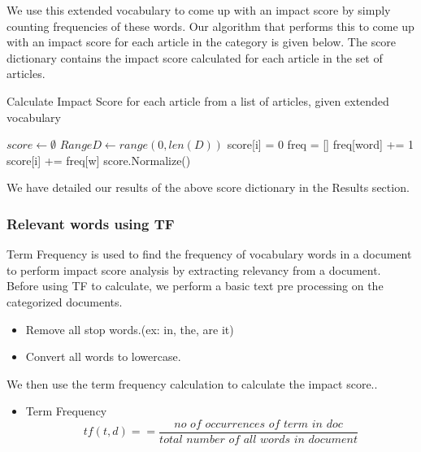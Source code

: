 \documentclass[paper=a4, fontsize=11pt]{scrartcl}
\numberwithin{equation}{section}		%
\numberwithin{figure}{section}			%
\numberwithin{table}{section}				%
\begin{document}
We use this extended vocabulary to come up with an impact score by simply counting frequencies of these words. Our algorithm that performs this to come up with an impact score for each article in the category is given below. The score dictionary contains the impact score calculated for each article in the set of articles.

\begin {center}
\begin {algorithm}[ht]
\SetNoFillComment
\caption{Calculate Impact Score for each article from a list of articles, given extended vocabulary}
 {
    $score \gets \emptyset $\;
    $RangeD \gets range(0, len(D)) $\;
     {
    	score[i] = 0 \;
	freq = [] \;
	 {
		freq[word] += 1 \;
	}
	 {
		score[i] += freq[w] \;
	}
    }
    score.Normalize() \;
    \;
}
\end {algorithm}
\end {center}

We have detailed our results of the above score dictionary in the Results section.

\subsubsection {Relevant words using TF}

Term Frequency is used to find the frequency of vocabulary words in a document to perform impact score analysis by extracting relevancy from a document.
Before using TF to calculate, we perform a basic text pre processing on the categorized documents.
\begin{itemize}
\item {Remove all stop words.(ex: in, the, are it)}
\item {Convert all words to lowercase.}
\end {itemize}
We then use the term frequency calculation to calculate the impact score..
\begin{itemize}
\item {Term Frequency}
\[tf(t,d) =  = \frac{\textit{no of occurrences of term in doc} }{\textit{total number of all words in document}}\]
\end{itemize}
\end{document}
